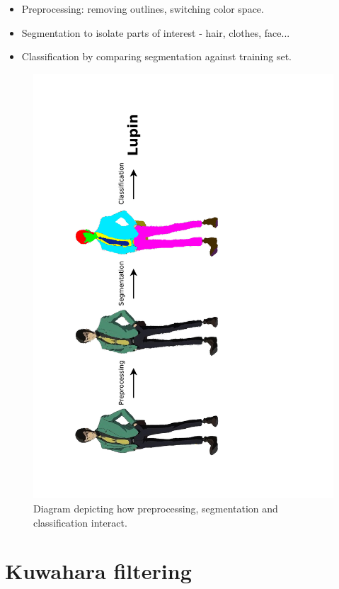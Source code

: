 \documentclass{beamer}
\begin{document}
\begin{frame}
\begin{itemize}
\item Preprocessing: removing outlines, switching color space.
\item Segmentation to isolate parts of interest - hair, clothes, face...
\item Classification by comparing segmentation against training set.
\end{itemize}

\begin{figure}[htb!]
\centerline{
\includegraphics[height=\textwidth,angle=270,clip=true,trim=2cm 0 6cm 0]{../images/visionSystemDiagram.pdf}
}
\caption{Diagram depicting how preprocessing, segmentation and classification interact.}
\end{figure}

\end{frame}

\section{Kuwahara filtering}
\end{document}
